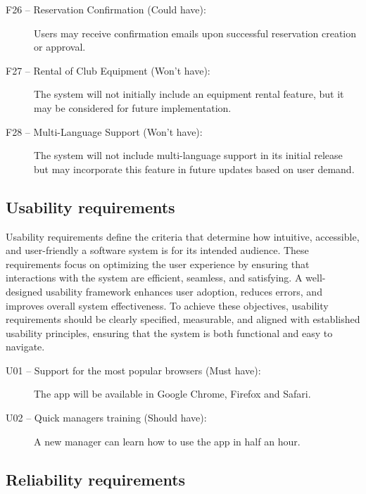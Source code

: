 \begin{description}
  \item [F26 -- Reservation Confirmation (Could have):] Users may receive confirmation emails upon successful reservation creation or approval.

  \item [F27 -- Rental of Club Equipment (Won’t have):] The system will not initially include an equipment rental feature, but it may be considered for future implementation.

  \item [F28 -- Multi-Language Support (Won’t have):] The system will not include multi-language support in its initial release but may incorporate this feature in future updates based on user demand.
\end{description}

\subsection{Usability requirements}

Usability requirements define the criteria that determine how intuitive, accessible, and user-friendly a software system is for its intended audience. These requirements focus on optimizing the user experience by ensuring that interactions with the system are efficient, seamless, and satisfying. A well-designed usability framework enhances user adoption, reduces errors, and improves overall system effectiveness. To achieve these objectives, usability requirements should be clearly specified, measurable, and aligned with established usability principles, ensuring that the system is both functional and easy to navigate. 

\begin{description}
  \item [U01 -- Support for the most popular browsers (Must have):] The app will be available in Google Chrome, Firefox and Safari.
  \item [U02 -- Quick managers training (Should have):] A new manager can learn how to use the app in half an hour.
\end{description}

\subsection{Reliability requirements}

